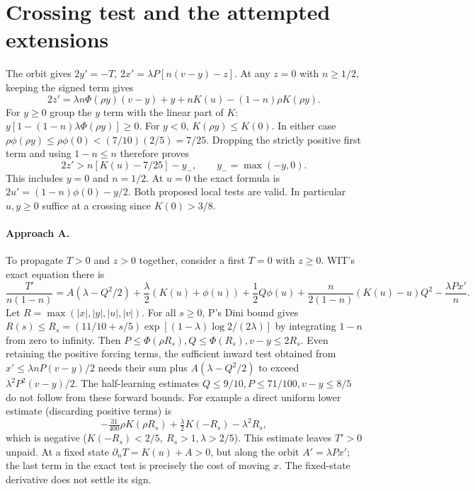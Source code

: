 \documentclass[11pt]{article}
\begin{document}
\section{Crossing test and the attempted extensions}\label{an01phsv1:cross}
The orbit gives \(2y'=-T\), \(2x'=\lambda P[n(v-y)-z]\).
At any \(z=0\) with \(n\ge1/2\), keeping the signed term gives
\[
 2z'=\lambda n\Phi(\rho y)(v-y)+y+nK(u)-(1-n)\rho K(\rho y).
\]
For \(y\ge0\) group the \(y\) term with the linear part of \(K\):
\(y[1-(1-n)\lambda\Phi(\rho y)]\ge0\). For \(y<0\),
\(K(\rho y)\le K(0)\). In either case
\(\rho\phi(\rho y)\le\rho\phi(0)<(7/10)(2/5)=7/25\).
Dropping the strictly positive first term and using \(1-n\le n\)
therefore proves
\begin{equation}\label{an01phsv1:reviewer}
 2z'>n[K(u)-7/25]-y_-,\qquad y_-=\max(-y,0).
\end{equation}
This includes \(y=0\) and \(n=1/2\). At \(u=0\) the exact formula is
\(2u'=(1-n)\phi(0)-y/2\). Both proposed local tests are valid.
In particular \(u,y\ge0\) suffice at a crossing since \(K(0)>3/8\).

\paragraph{Approach A.} To propagate \(T>0\) and \(z>0\) together,
consider a first \(T=0\) with \(z\ge0\). WIT's exact equation there is
\[
 \frac{T'}{n(1-n)}
 =A(\lambda-Q^2/2)+\frac\lambda2(K(u)+\phi(u))
 +\frac12Q\phi(u)+\frac{n}{2(1-n)}(K(u)-u)Q^2
 -\frac{\lambda P x'}n .
\]
Let \(R=\max(|x|,|y|,|u|,|v|)\). For all \(s\ge0\), P's Dini
bound gives \(R(s)\le R_s=(11/10+s/5)\exp[(1-\lambda)\log2/(2\lambda)]\)
by integrating \(1-n\) from zero to infinity.
Then \(P\le\Phi(\rho R_s), Q\le\Phi(R_s),v-y\le2R_s\).
Even retaining the positive forcing terms, the sufficient inward test
obtained from \(x'\le\lambda nP(v-y)/2\) needs their sum plus
\(A(\lambda-Q^2/2)\) to exceed \(\lambda^2P^2(v-y)/2\).
The half-learning estimates \(Q\le9/10,P\le71/100,v-y\le8/5\)
do not follow from these forward bounds. For example a direct uniform
lower estimate (discarding positive terms) is
\[
 -\tfrac{31}{400}\rho K(\rho R_s)
 +\tfrac{\lambda}{2}K(-R_s)-\lambda^2 R_s ,
\]
which is negative (\(K(-R_s)<2/5,\ R_s>1,\lambda>2/5\)).
This estimate leaves \(T'>0\) unpaid. At a fixed state
\(\partial_n T=K(u)+A>0\), but along the orbit \(A'=\lambda Px'\);
the last term in the exact test is precisely the cost of moving \(x\).
The fixed-state derivative does not settle its sign.
\end{document}
